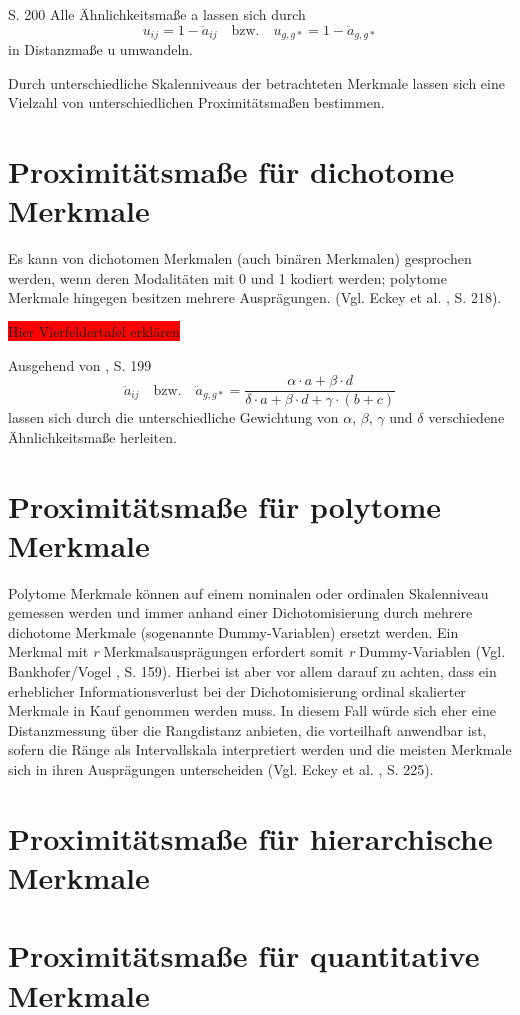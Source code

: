 \cite{Bacher.2010} S. 200 Alle Ähnlichkeitsmaße a lassen sich durch 
\begin{equation}
u_{ij} = 1 - \ddot{a}_{ij} \quad \text{bzw.} \quad u_{g,g*} = 1- \ddot{a}_{g,g*}
\end{equation}
in Distanzmaße u umwandeln.

Durch unterschiedliche Skalenniveaus der betrachteten Merkmale lassen sich eine Vielzahl von unterschiedlichen Proximitätsmaßen bestimmen.

\section{Proximitätsmaße für dichotome Merkmale}
Es kann von dichotomen Merkmalen (auch binären Merkmalen) gesprochen werden, wenn deren Modalitäten mit 0 und 1 kodiert werden; polytome Merkmale hingegen besitzen mehrere Ausprägungen. (Vgl. Eckey et al. \cite{Eckey.2002}, S. 218). 

\colorbox{red}{Hier Vierfeldertafel erklären}

Ausgehend von \cite{Bacher.2010}, S. 199
\begin{equation}
\ddot{a}_{ij} \quad \text{bzw.} \quad \ddot{a}_{g,g*} = \frac{\alpha \cdot a + \beta \cdot d}{\delta \cdot a + \beta \cdot d + \gamma \cdot (b + c)}
\end{equation}
lassen sich durch die unterschiedliche Gewichtung von $\alpha$, $\beta$, $\gamma$ und $\delta$  verschiedene Ähnlichkeitsmaße herleiten.

\section{Proximitätsmaße für polytome Merkmale}
Polytome Merkmale können auf einem nominalen oder ordinalen Skalenniveau gemessen werden und immer anhand einer Dichotomisierung durch mehrere dichotome Merkmale (sogenannte Dummy-Variablen) ersetzt werden. Ein Merkmal mit \textit{r} Merkmalsausprägungen erfordert somit \textit{r} Dummy-Variablen (Vgl. Bankhofer/Vogel \cite{Bankhofer.2008}, S. 159). Hierbei ist aber vor allem darauf zu achten, dass ein erheblicher Informationsverlust bei der Dichotomisierung ordinal skalierter Merkmale in Kauf genommen werden muss. In diesem Fall würde sich eher eine Distanzmessung über die Rangdistanz anbieten, die vorteilhaft anwendbar ist, sofern die Ränge als Intervallskala interpretiert werden und die meisten Merkmale sich in ihren Ausprägungen unterscheiden (Vgl. Eckey et al. \cite{Eckey.2002}, S. 225).

\section{Proximitätsmaße für hierarchische Merkmale}
\section{Proximitätsmaße für quantitative Merkmale}
